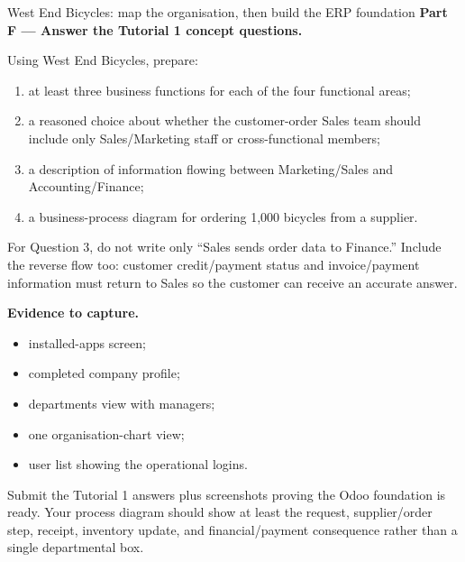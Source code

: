 \begin{labproject}{West End Bicycles: map the organisation, then build the ERP foundation}
\medskip\noindent\textbf{Part F --- Answer the Tutorial 1 concept questions.}

Using West End Bicycles, prepare:
\begin{enumerate}
  \item at least three business functions for each of the four functional areas;
  \item a reasoned choice about whether the customer-order Sales team should include only Sales/Marketing staff or cross-functional members;
  \item a description of information flowing between Marketing/Sales and Accounting/Finance;
  \item a business-process diagram for ordering 1,000 bicycles from a supplier.
\end{enumerate}

\begin{tryit}
For Question 3, do not write only ``Sales sends order data to Finance.'' Include the reverse flow too: customer credit/payment status and invoice/payment information must return to Sales so the customer can receive an accurate answer.
\end{tryit}

\medskip\noindent\textbf{Evidence to capture.}
\begin{itemize}
  \item installed-apps screen;
  \item completed company profile;
  \item departments view with managers;
  \item one organisation-chart view;
  \item user list showing the operational logins.
\end{itemize}
\end{labproject}

\begin{labdeliverable}
Submit the Tutorial 1 answers plus screenshots proving the Odoo foundation is ready. Your process diagram should show at least the request, supplier/order step, receipt, inventory update, and financial/payment consequence rather than a single departmental box.
\end{labdeliverable}
